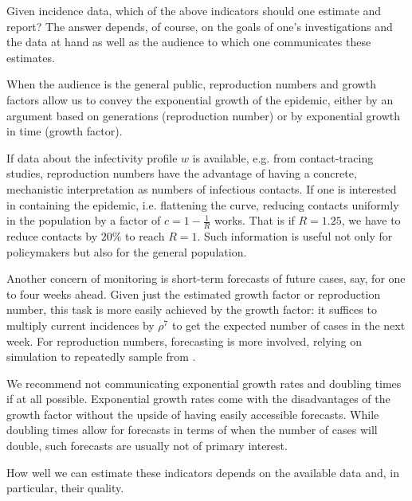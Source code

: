Given incidence data, which of the above indicators should one estimate and report? The answer depends, of course, on the goals of one's investigations and the data at hand as well as the audience to which one communicates these estimates. 

When the audience is the general public, reproduction numbers and growth factors allow us to convey the exponential growth of the epidemic, either by an argument based on generations (reproduction number) or by exponential growth in time (growth factor).

If data about the infectivity profile $w$ is available, e.g. from contact-tracing studies, reproduction numbers have the advantage of having a concrete, mechanistic interpretation as numbers of infectious contacts. If one is interested in containing the epidemic, i.e. \glqq{}flattening the curve\grqq{}, reducing contacts uniformly in the population by a factor of $c = 1 - \frac{1}{R}$ works. That is if $R = 1.25$, we have to reduce contacts by $20\%$ to reach $R = 1$. Such information is useful not only for policymakers but also for the general population. 

Another concern of monitoring is short-term forecasts of future cases, say, for one to four weeks ahead. Given just the estimated growth factor or reproduction number, this task is more easily achieved by the growth factor: it suffices to multiply current incidences by $\rho^{7}$ to get the expected number of cases in the next week. For reproduction numbers, forecasting is more involved, relying on simulation to repeatedly sample from .

We recommend not communicating exponential growth rates and doubling times if at all possible. Exponential growth rates come with the disadvantages of the growth factor without the upside of having easily accessible forecasts. While doubling times allow for forecasts in terms of when the number of cases will double, such forecasts are usually not of primary interest. 

How well we can estimate these indicators depends on the available data and, in particular, their quality.